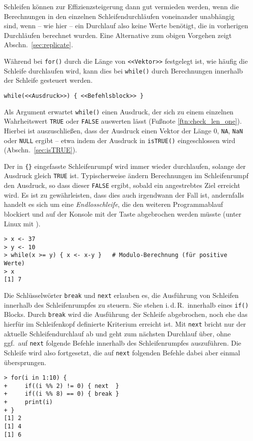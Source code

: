 Schleifen können zur Effizienzsteigerung dann gut vermieden werden, wenn die Berechnungen in den einzelnen Schleifendurchläufen voneinander unabhängig sind, wenn -- wie hier -- ein Durchlauf also keine Werte benötigt, die in vorherigen Durchläufen berechnet wurden. Eine Alternative zum obigen Vorgehen zeigt Abschn.\ \ref{sec:replicate}.

Während bei \lstinline!for()! durch die Länge von \lstinline!<<Vektor>>! festgelegt ist, wie häufig die Schleife durchlaufen wird, kann dies bei \lstinline!while()! durch Berechnungen innerhalb der Schleife gesteuert werden.
\begin{lstlisting}
while(<<Ausdruck>>) { <<Befehlsblock>> }
\end{lstlisting}

Als Argument erwartet \lstinline!while()! einen Ausdruck, der sich zu einem einzelnen Wahrheitswert \lstinline!TRUE! oder \lstinline!FALSE! auswerten lässt (Fußnote \ref{ftn:check_len_one}). Hierbei ist auszuschließen, dass der Ausdruck einen Vektor der Länge 0, \lstinline!NA!, \lstinline!NaN! oder \lstinline!NULL! ergibt -- etwa indem der Ausdruck in \lstinline!isTRUE()! eingeschlossen wird (Abschn.\ \ref{sec:isTRUE}).

Der in \lstinline!{}! eingefasste Schleifenrumpf wird immer wieder durchlaufen, solange der Ausdruck gleich \lstinline!TRUE! ist. Typischerweise ändern Berechnungen im Schleifenrumpf den Ausdruck, so dass dieser \lstinline!FALSE! ergibt, sobald ein angestrebtes Ziel erreicht wird. Es ist zu gewährleisten, dass dies auch irgendwann der Fall ist, andernfalls handelt es sich um eine \emph{Endlosschleife}, die den weiteren Programmablauf blockiert und auf der Konsole mit der  Taste abgebrochen werden müsste (unter Linux mit ).
\begin{lstlisting}
> x <- 37
> y <- 10
> while(x >= y) { x <- x-y }   # Modulo-Berechnung (für positive Werte)
> x
[1] 7
\end{lstlisting}

Die Schlüsselwörter \lstinline!break! und \lstinline!next! erlauben es, die Ausführung von Schleifen innerhalb des Schleifenrumpfes zu steuern. Sie stehen i.\,d.\,R.\ innerhalb eines \lstinline!if()! Blocks. Durch \lstinline!break! wird die Ausführung der Schleife abgebrochen, noch ehe das hierfür im Schleifenkopf definierte Kriterium erreicht ist. Mit \lstinline!next! bricht nur der aktuelle Schleifendurchlauf ab und geht zum nächsten Durchlauf über, ohne ggf.\ auf \lstinline!next! folgende Befehle innerhalb des Schleifenrumpfes auszuführen. Die Schleife wird also fortgesetzt, die auf \lstinline!next! folgenden Befehle dabei aber einmal übersprungen.
\begin{lstlisting}
> for(i in 1:10) {
+     if((i %% 2) != 0) { next  }
+     if((i %% 8) == 0) { break }
+     print(i)
+ }
[1] 2
[1] 4
[1] 6
\end{lstlisting}

